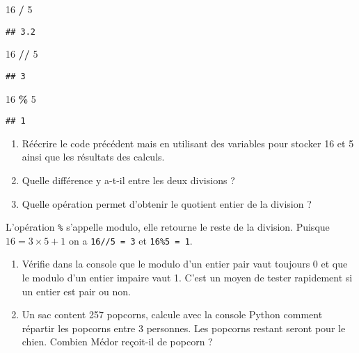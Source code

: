 \documentclass[
]{book}
\newenvironment{Shaded}{\begin{snugshade}}{\end{snugshade}}
\newcommand{\DecValTok}[1]{\textcolor[rgb]{0.00,0.00,0.81}{#1}}
\newcommand{\OperatorTok}[1]{\textcolor[rgb]{0.81,0.36,0.00}{\textbf{#1}}}
\providecommand{\tightlist}{%
  \setlength{\itemsep}{0pt}\setlength{\parskip}{0pt}}
\def\tightlist{}
\begin{document}
\begin{Shaded}
\begin{Highlighting}[]
\DecValTok{16} \OperatorTok{/} \DecValTok{5}
\end{Highlighting}
\end{Shaded}

\begin{verbatim}
## 3.2
\end{verbatim}

\begin{Shaded}
\begin{Highlighting}[]
\DecValTok{16} \OperatorTok{//} \DecValTok{5}
\end{Highlighting}
\end{Shaded}

\begin{verbatim}
## 3
\end{verbatim}

\begin{Shaded}
\begin{Highlighting}[]
\DecValTok{16} \OperatorTok{\%} \DecValTok{5}
\end{Highlighting}
\end{Shaded}

\begin{verbatim}
## 1
\end{verbatim}

\begin{enumerate}
\def\labelenumi{\arabic{enumi}.}
\setcounter{enumi}{1}
\tightlist
\item
  Réécrire le code précédent mais en utilisant des variables pour stocker 16 et 5 ainsi que les résultats des calculs.
\item
  Quelle différence y a-t-il entre les deux divisions ?
\item
  Quelle opération permet d'obtenir le quotient entier de la division ?
\end{enumerate}

L'opération \texttt{\%} s'appelle modulo, elle retourne le reste de la division. Puisque \(16= 3\times 5 + 1\) on a \texttt{16//5\ =\ 3} et \texttt{16\%5\ =\ 1}.

\begin{enumerate}
\def\labelenumi{\arabic{enumi}.}
\setcounter{enumi}{3}
\tightlist
\item
  Vérifie dans la console que le modulo d'un entier pair vaut toujours 0 et que le modulo d'un entier impaire vaut 1. C'est un moyen de tester rapidement si un entier est pair ou non.
\item
  Un sac content 257 popcorns, calcule avec la console Python comment répartir les popcorns entre 3 personnes. Les popcorns restant seront pour le chien. Combien Médor reçoit-il de popcorn ?
\end{enumerate}
\end{document}
